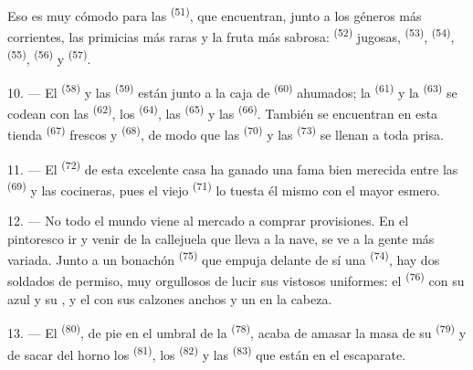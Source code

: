 Eso es muy cómodo para las  \textsuperscript{(51)}, que encuentran,
junto a los géneros más corrientes, las primicias más raras y la fruta más
sabrosa:  \textsuperscript{(52)} jugosas, 
\textsuperscript{(53)},  \textsuperscript{(54)}, 
\textsuperscript{(55)},  \textsuperscript{(56)} y 
\textsuperscript{(57)}.

\VUsaut{4.0mm}
\VUsaut{3.0mm}

10. --- El  \textsuperscript{(58)} y las 
\textsuperscript{(59)} están junto a la caja de  \textsuperscript{(60)}
ahumados; la  \textsuperscript{(61)} y la 
\textsuperscript{(63)} se codean con las  \textsuperscript{(62)}, los
 \textsuperscript{(64)}, las  \textsuperscript{(65)} y
las  \textsuperscript{(66)}. También se encuentran en esta tienda
 \textsuperscript{(67)} frescos y  \textsuperscript{(68)},
de modo que las  \textsuperscript{(70)} y las  \textsuperscript{(73)} se llenan a toda prisa.

11. --- El  \textsuperscript{(72)} de esta excelente casa ha ganado una
fama bien merecida entre las  \textsuperscript{(69)} y las cocineras,
pues el viejo  \textsuperscript{(71)} lo tuesta él mismo con el mayor
esmero.

\VUsaut{4.0mm}
\VUsaut{3.0mm}

12. --- No todo el mundo viene al mercado a comprar provisiones. En el
pintoresco ir y venir de la callejuela que lleva a la nave, se ve a la
gente más variada. Junto a un bonachón  \textsuperscript{(75)} que
empuja delante de sí una  \textsuperscript{(74)}, hay dos
soldados de permiso, muy orgullosos de lucir sus vistosos uniformes: el
 \textsuperscript{(76)} con su  azul y su
, y el  con sus calzones
anchos y un  en la cabeza.

13. --- El  \textsuperscript{(80)}, de pie en el umbral de la
 \textsuperscript{(78)}, acaba de amasar la masa de su
 \textsuperscript{(79)} y de sacar del horno los 
\textsuperscript{(81)}, los  \textsuperscript{(82)} y las 
\textsuperscript{(83)} que están en el escaparate.

